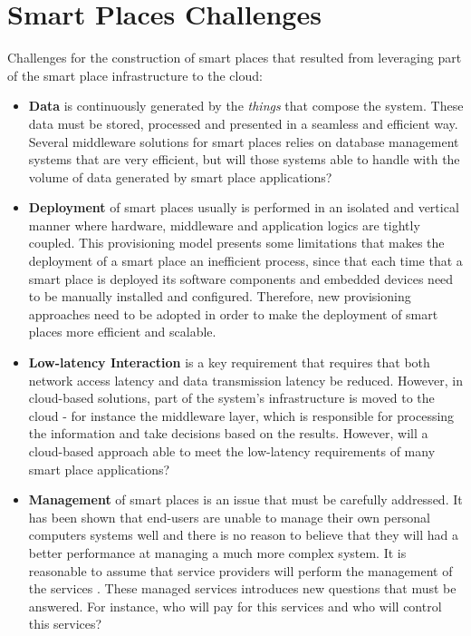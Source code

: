 \section{Smart Places Challenges}
\label{section:challenges}
Challenges \cite{caceres2012ubicomp} for the construction of smart places that resulted from leveraging
part of the smart place infrastructure to the cloud:\\

\begin{itemize}
  \item \textbf{Data} is continuously generated by the \textit{things} that compose the system.
  These data must be stored, processed and presented in a seamless and efficient way. Several
  middleware solutions for smart places \cite{floerkemeier2007rfid}\cite{eisenhauer2010hydra}\cite{de2008socrades}
  relies on database management systems that are very efficient, but will those systems able to
  handle with the volume of data generated by smart place applications?
  \item \textbf{Deployment} of smart places usually is performed in an isolated and vertical manner
  where hardware, middleware and application logics are tightly coupled. This provisioning model presents
  some limitations that makes the deployment of a smart place an inefficient process, since that each
  time that a smart place is deployed its software components and embedded devices need to be manually
  installed and configured. Therefore, new provisioning approaches need to be adopted in order to make
  the deployment of smart places more efficient and scalable.
  \item \textbf{Low-latency Interaction} is a key requirement that requires that both network access
  latency and data transmission latency be reduced. However, in cloud-based solutions, part of the
  system's infrastructure is moved to the cloud - for instance the middleware layer, which is responsible
  for processing the information and take decisions based on the results. However, will a cloud-based
  approach able to meet the low-latency requirements of many smart place applications?
  \item \textbf{Management} of smart places is an issue that must be carefully addressed. It has been
  shown that end-users are unable to manage their own personal computers systems well \cite{doll1988measurement}
  and there is no reason to believe that they will had a better performance at managing a much more
  complex system. It is reasonable to assume that service providers will perform the management of
  the services . These managed services introduces new questions that must be answered. For instance,
  who will pay for this services and who will control this services?
\end{itemize}

